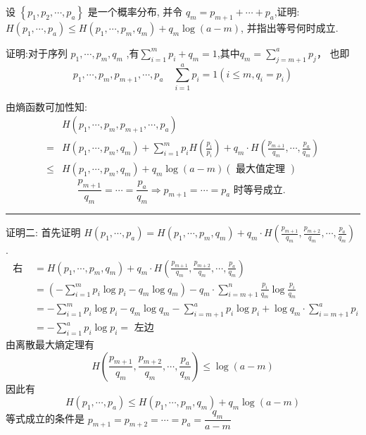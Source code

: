   \begin{exercise}
设 $ \left\{p_{1}, p_{2}, \cdots, p_{a}\right\} $ 是一个概率分布, 并令 $ q_{m}=p_{m+1}+\cdots+p_{a} $,证明: $ H\left(p_{1}, \cdots, p_{a}\right) \leqslant H\left(p_{1}, \cdots, p_{m}, q_{m}\right)+q_{m} \log (a-m) $, 并指出等号何时成立.
 \end{exercise}
 \begin{solution}
     证明:对于序列 $ p_{1}, \cdots, p_{m}, q_{m} $ ,有$ \sum\limits_{i=1}^{m} p_{i}+q_{m}=1$,其中$q_{m}=\sum\limits_{j=m+1}^{a} p_{j} $， 也即
$$
p_{1}, \cdots, p_{m}, p_{m+1}, \cdots, p_{a} \quad \sum_{i=1}^{a} p_{i}=1\left(i \leqslant m, q_{i}=p_{i}\right)
$$

由熵函数可加性知:
$$
\begin{aligned}
& H\left(p_{1}, \cdots, p_{m}, p_{m+1}, \cdots, p_{a}\right) \\
= & H\left(p_{1}, \cdots, p_{m}, q_{m}\right)+\sum_{i=1}^{m} p_{i} H\left(\frac{p_{i}}{p_{i}}\right)+q_{m} \cdot H\left(\frac{p_{m+1}}{q_{m}}, \cdots, \frac{p_{a}}{q_{m}}\right) \\
\leqslant & H\left(p_{1}, \cdots, p_{m}, q_{m}\right)+q_{m} \log (a-m)(\text { 最大值定理 })
\end{aligned}
$$
$$
\frac{p_{m+1}}{q_{m}}=\cdots=\frac{p_{a}}{q_{m}} \Rightarrow p_{m+1}=\cdots=p_{a} \text { 时等号成立. }
$$
\hrule
证明二: 首先证明 $ H\left(p_{1}, \cdots, p_{a}\right)=H\left(p_{1}, \cdots, p_{m}, q_{m}\right)+q_{m} \cdot H\left(\frac{p_{m+1}}{q_{m}}, \frac{p_{m+2}}{q_{m}}, \cdots, \frac{p_{a}}{q_{m}}\right) $ .
$$
\begin{aligned}
\text { 右边 } & =H\left(p_{1}, \cdots, p_{m}, q_{m}\right)+q_{m} \cdot H\left(\frac{p_{m+1}}{q_{m}}, \frac{p_{m+2}}{q_{m}}, \cdots, \frac{p_{a}}{q_{m}}\right)\\&=\left(-\sum_{i=1}^{m} p_{i} \log p_{i}-q_{m} \log q_{m}\right)-q_{m} \cdot \sum_{i=m+1}^{n} \frac{p_{i}}{q_{m}} \log \frac{p_{i}}{q_{m}} \\
& =-\sum_{i=1}^{m} p_{i} \log p_{i}-q_{m} \log q_{m}-\sum_{i=m+1}^{a} p_{i} \log p_{i}+\log q_{m} \cdot \sum_{i=m+1}^{a} p_{i}\\&=-\sum_{i=1}^{a} p_{i} \log p_{i}=\text { 左边 }
\end{aligned}
$$
由离散最大熵定理有
$$
H\left(\frac{p_{m+1}}{q_{m}}, \frac{p_{m+2}}{q_{m}}, \cdots, \frac{p_{a}}{q_{m}}\right) \leqslant \log (a-m)
$$
因此有
$$
H\left(p_{1}, \cdots, p_{a}\right) \leqslant H\left(p_{1}, \cdots, p_{m}, q_{m}\right)+q_{m} \log (a-m)
$$
等式成立的条件是 $ p_{m+1}=p_{m+2}=\cdots=p_{a}=\dfrac{q_{m}}{a-m} $ 
 \end{solution}

